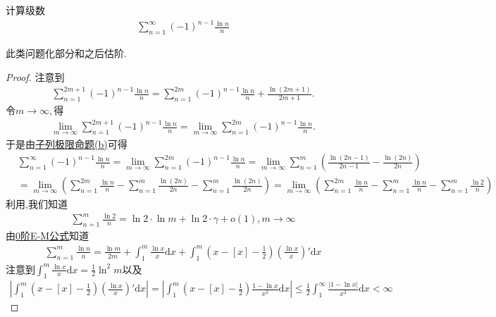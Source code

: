 \documentclass[../../main.tex]{subfiles}
\begin{document}
\begin{example}
计算级数
\begin{align*}
\sum_{n=1}^{\infty} (-1)^{n - 1} \frac{\ln n}{n}
\end{align*}
\end{example}
\begin{note}
此类问题化部分和之后估阶.
\end{note}
\begin{proof}
注意到
\begin{align*}
\sum_{n=1}^{2m+1}{\left( -1 \right) ^{n-1}\frac{\ln n}{n}}=\sum_{n=1}^{2m}{\left( -1 \right) ^{n-1}\frac{\ln n}{n}}+\frac{\ln \left( 2m+1 \right)}{2m+1}.
\end{align*}
令$m\rightarrow \infty ,$得
\begin{align*}
\underset{m\rightarrow \infty}{\lim}\sum_{n=1}^{2m+1}{\left( -1 \right) ^{n-1}\frac{\ln n}{n}}=\underset{m\rightarrow \infty}{\lim}\sum_{n=1}^{2m}{\left( -1 \right) ^{n-1}\frac{\ln n}{n}}.
\end{align*}
于是由\hyperref[proposition:子列极限命题]{子列极限命题(b)}可得
\begin{align*}
&\sum_{n=1}^{\infty} (-1)^{n - 1} \frac{\ln n}{n} = \lim_{m \to \infty} \sum_{n=1}^{2m} (-1)^{n - 1} \frac{\ln n}{n} = \lim_{m \to \infty} \sum_{n=1}^{m} \left( \frac{\ln(2n - 1)}{2n - 1} - \frac{\ln(2n)}{2n} \right) \\
&= \lim_{m \to \infty} \left( \sum_{n=1}^{2m} \frac{\ln n}{n} - \sum_{n=1}^{m} \frac{\ln(2n)}{2n} - \sum_{n=1}^{m} \frac{\ln(2n)}{2n} \right) = \lim_{m \to \infty} \left( \sum_{n=1}^{2m} \frac{\ln n}{n} - \sum_{n=1}^{m} \frac{\ln n}{n} - \sum_{n=1}^{m} \frac{\ln 2}{n} \right)
\end{align*}
利用,我们知道
\begin{align*}
\sum_{n=1}^{m} \frac{\ln 2}{n} = \ln 2 \cdot \ln m + \ln 2 \cdot \gamma + o(1), m \to \infty
\end{align*}
由\hyperref[theorem:0阶Euler-Maclaurin公式(0阶E-M公式)]{0阶E-M公式}知道
\begin{align*}
\sum_{n=1}^{m} \frac{\ln n}{n} = \frac{\ln m}{2m} + \int_{1}^{m} \frac{\ln x}{x} \mathrm{d}x + \int_{1}^{m} \left( x - [x] - \frac{1}{2} \right) \left( \frac{\ln x}{x} \right)' \mathrm{d}x
\end{align*}
注意到$\int_{1}^{m} \frac{\ln x}{x} \mathrm{d}x = \frac{1}{2} \ln^2 m$以及
\begin{align*}
\left| \int_{1}^{m} \left( x - [x] - \frac{1}{2} \right) \left( \frac{\ln x}{x} \right)' \mathrm{d}x \right| = \left| \int_{1}^{m} \left( x - [x] - \frac{1}{2} \right) \frac{1 - \ln x}{x^2} \mathrm{d}x \right| \leqslant \frac{1}{2} \int_{1}^{\infty} \frac{|1 - \ln x|}{x^2} \mathrm{d}x < \infty

\end{align*}
\end{proof}
\end{document}
